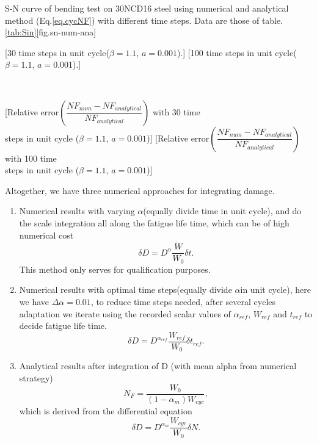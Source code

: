\begin{Figure}[]{S-N curve of bending test on 30NCD16 steel using numerical and analytical method (Eq.\eqref{eq.cycNF}) with different time steps. Data are those of table.\ref{tab:Sin}}[fig.sn-num-ana]
	\centerline{
		[30 time steps in unit cycle($\beta=1.1$, $a=0.001$).]
		[100 time steps in unit cycle($\beta=1.1$, $a=0.001$).]}
	\\
	\centerline{
		[Relative error$\left( \dfrac{NF_{num}-NF_{analytical}}{NF_{analytical}}\right)$  with 30 time \protect \\ steps in unit cycle  ($\beta=1.1$, $a=0.001$)]
		[Relative error$\left( \dfrac{NF_{num}-NF_{analytical}}{NF_{analytical}}\right)$   with 100 time \protect \\ steps in unit cycle  ($\beta=1.1$, $a=0.001$)]}
	\label{fig.sn-num-ana}
\end{Figure}

\newpage

Altogether, we have three numerical approaches for integrating damage.

\begin{enumerate}
	\item  Numerical results with varying $\alpha$(equally divide time in unit cycle), and do the scale integration all along the fatigue life time, which can be of high numerical cost$$\delta D=D^\alpha\frac{\dot{W}}{W_0}\delta t.$$
	This method only serves for qualification purposes.
	\vspace{6pt}
	
	\item  Numerical results with optimal time steps(equally divide $\alpha$in unit cycle), here we have $\Delta\alpha=0.01$, to reduce time steps needed, after several cycles adaptation we iterate using the recorded scalar values of $\alpha_{ref}$, $W_{ref}$ and $t_{ref}$ to decide fatigue life time.
	$$\delta D=D^{\alpha_{ref}}\frac{W_{ref}}{W_0}\delta t_{ref}.$$
	\vspace{6pt}
	
	\item  Analytical results after integration of D (with mean alpha from numerical strategy)$$N_F=\frac{W_0}{( 1-\alpha_m)W_{cyc}},$$ 
	which is derived from the differential equation
	$$\delta D=D^{\alpha_m}\frac{W_{cyc}}{W_0}\delta N.$$
\end{enumerate}	

